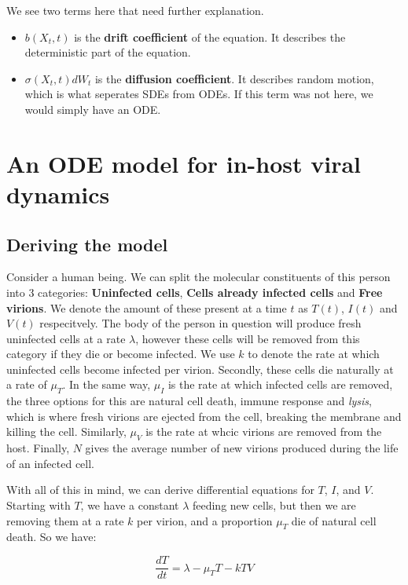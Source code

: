 We see two terms here that need further explanation.

\begin{itemize}
    \item $b(X_t,t)$ is the \textbf{drift coefficient} of the equation. It describes the deterministic part of the equation. \\
    \item $\sigma (X_t,t)dW_t$ is the \textbf{diffusion coefficient}. It describes random motion, which is what seperates SDEs from ODEs. If this term was not here, we would simply have an ODE.
\end{itemize}

\section{An ODE model for in-host viral dynamics}

\subsection{Deriving the model}

Consider a human being. We can split the molecular constituents of this person into 3 categories: \textbf{Uninfected cells}, \textbf{Cells already infected cells} and \textbf{Free virions}. We denote the amount of these present at a time $t$ as  $T(t)$,  $I(t)$ and  $V(t)$ respecitvely.
The body of the person in question will produce fresh uninfected cells at a rate $\lambda$, however these cells will be removed from this category if they die or become infected. We use  $k$ to denote the rate at which uninfected cells become infected per virion. Secondly, these cells die naturally at a rate of  $\mu_T$. In the same way, $\mu_I$ is the rate at which infected cells are removed, the three options for this are natural cell death, immune response and \textit{lysis}, which is where fresh virions are ejected from the cell, breaking the membrane and killing the cell.
Similarly, $\mu_V$ is the rate at whcic virions are removed from the host. Finally, $N$ gives the average number of new virions produced during the life of an infected cell. 

With all of this in mind, we can derive differential equations for $T$,  $I$, and  $V$. Starting with $T$, we have a constant  $\lambda$ feeding new cells, but then we are removing them at a rate $k$ per virion, and a proportion $\mu_T$ die of natural cell death. So we have:

\[
    \frac{dT}{dt} = \lambda - \mu_TT - kTV    
\] 

